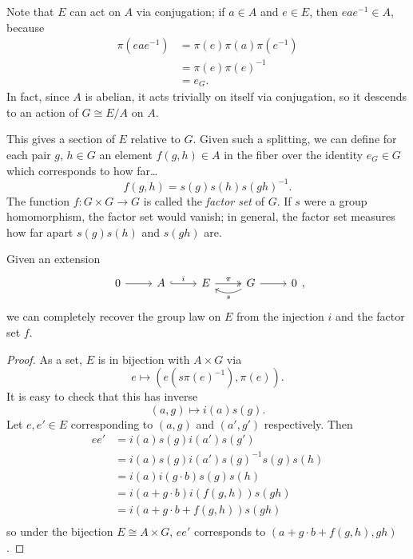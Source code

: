 \documentclass[main.tex]{subfiles}
\begin{document}
Note that $E$ can act on $A$ via conjugation; if $a \in A$ and $e \in E$, then $eae^{-1} \in A$, because
\begin{align*}
  \pi(eae^{-1}) &=\pi(e)\pi(a)\pi(e^{-1}) \\
  &= \pi(e)\pi(e)^{-1} \\
  &= e_{G}.
\end{align*}
In fact, since $A$ is abelian, it acts trivially on itself via conjugation, so it descends to an action of $G \cong E/A$ on $A$.

This gives a section of $E$ relative to $G$. Given such a splitting, we can define for each pair $g$, $h \in G$ an element $f(g, h) \in A$ in the fiber over the identity $e_{G} \in G$ which corresponds to how far\dots
\begin{equation*}
  f(g, h) = s(g)s(h)s(gh)^{-1}.
\end{equation*}
The function $f\colon G \times G \to G$ is called the \emph{factor set} of $G$. If $s$ were a group homomorphism, the factor set would vanish; in general, the factor set measures how far apart $s(g)s(h)$ and $s(gh)$ are.

\begin{lemma}
  \label{lemma:recover_group_law_on_extension_by_factor_set}
  Given an extension
  \begin{equation*}
    \begin{tikzcd}
      0
      \arrow[r]
      & A
      \arrow[r, hook, "i"]
      & E
      \arrow[r, two heads, "\pi"]
      & G
      \arrow[r]
      \arrow[l, bend left, "s"]
      & 0
    \end{tikzcd},
  \end{equation*}
  we can completely recover the group law on $E$ from the injection $i$ and the factor set $f$.
\end{lemma}
\begin{proof}
  As a set, $E$ is in bijection with $A \times G$ via
  \begin{equation*}
    e \mapsto (e(s\pi(e)^{-1}), \pi(e)).
  \end{equation*}
  It is easy to check that this has inverse
  \begin{equation*}
    (a, g) \mapsto i(a)s(g).
  \end{equation*}
  Let $e, e' \in E$ corresponding to $(a, g)$ and $(a', g')$ respectively. Then
  \begin{align*}
    ee' &= i(a)s(g) i(a')s(g') \\
    &= i(a)s(g)i(a')s(g)^{-1}s(g)s(h) \\
    &= i(a)i(g\cdot b) s(g) s(h) \\
    &= i(a + g\cdot b) i(f(g, h))s(gh) \\
    &= i(a + g\cdot b + f(g, h))s(gh) \\
  \end{align*}
  so under the bijection $E \cong A \times G$, $ee'$ corresponds to $(a + g\cdot b + f(g, h), gh)$.
\end{proof}
\end{document}
